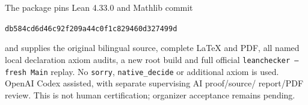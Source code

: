 \documentclass[11pt]{article}
\begin{document}
The package pins Lean 4.33.0 and Mathlib commit
\begin{center}\small\texttt{db584cd6d46c92f209a44c0f1c829460d327499d}\end{center}
and supplies the original bilingual source, complete LaTeX and
PDF, all named local declaration axiom audits, a new root build
and full official \texttt{leanchecker --fresh Main} replay.
No \texttt{sorry}, \texttt{native\_decide} or additional axiom is used.
OpenAI Codex assisted, with separate supervising AI proof/source/
report/PDF review. This is not human certification; organizer
acceptance remains pending.
\end{document}
